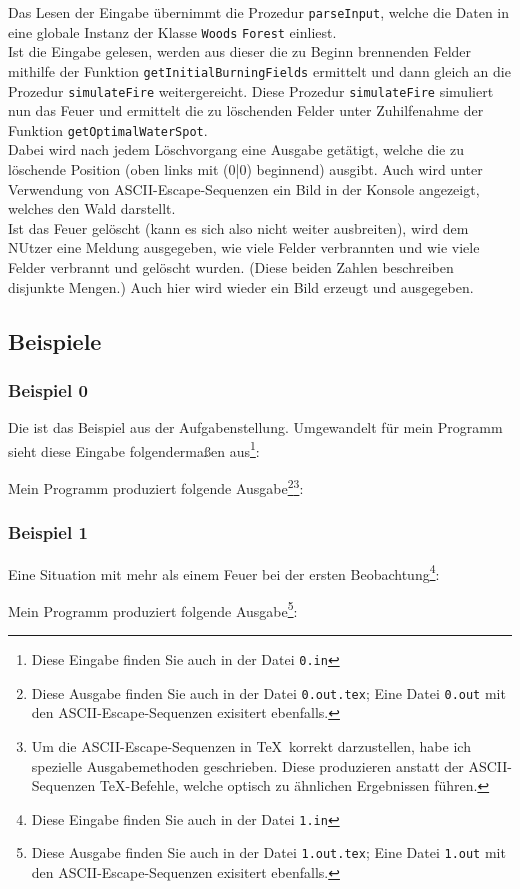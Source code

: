 Das Lesen der Eingabe übernimmt die Prozedur \texttt{parseInput}, welche die Daten in eine globale Instanz der Klasse \texttt{Woods} \texttt{Forest} einliest.\\
Ist die Eingabe gelesen, werden aus dieser die zu Beginn brennenden Felder mithilfe der Funktion \texttt{getInitialBurningFields} ermittelt und dann gleich an die Prozedur \texttt{simulateFire} weitergereicht. Diese Prozedur \texttt{simulateFire} simuliert nun das Feuer und ermittelt die zu löschenden Felder unter Zuhilfenahme der Funktion \texttt{getOptimalWaterSpot}.\\
Dabei wird nach jedem Löschvorgang eine Ausgabe getätigt, welche die zu löschende Position (oben links mit (0|0) beginnend) ausgibt. Auch wird unter Verwendung von ASCII-Escape-Sequenzen ein Bild in der Konsole angezeigt, welches den Wald darstellt.\\
Ist das Feuer gelöscht (kann es sich also nicht weiter ausbreiten), wird dem NUtzer eine Meldung ausgegeben, wie viele Felder verbrannten und wie viele Felder verbrannt und gelöscht wurden. (Diese beiden Zahlen beschreiben disjunkte Mengen.) Auch hier wird wieder ein Bild erzeugt und ausgegeben.
\newpage
\subsection{Beispiele}
\subsubsection{Beispiel 0}
Die ist das Beispiel aus der Aufgabenstellung. Umgewandelt für mein Programm sieht diese Eingabe folgendermaßen aus\footnote{Diese Eingabe finden Sie auch in der Datei \texttt{0.in}}:
{\small

}
Mein Programm produziert folgende Ausgabe\footnote{Diese Ausgabe finden Sie auch in der Datei \texttt{0.out.tex}; Eine Datei \texttt{0.out} mit den ASCII-Escape-Sequenzen exisitert ebenfalls.}\footnote{Um die ASCII-Escape-Sequenzen in \TeX\, korrekt darzustellen, habe ich spezielle Ausgabemethoden geschrieben. Diese produzieren anstatt der ASCII-Sequenzen \TeX -Befehle, welche optisch zu ähnlichen Ergebnissen führen.}:\\
{\ttfamily \small

}
\subsubsection{Beispiel 1}
Eine Situation mit mehr als einem Feuer bei der ersten Beobachtung\footnote{Diese Eingabe finden Sie auch in der Datei \texttt{1.in}}:
{\small

}
Mein Programm produziert folgende Ausgabe\footnote{Diese Ausgabe finden Sie auch in der Datei \texttt{1.out.tex}; Eine Datei \texttt{1.out} mit den ASCII-Escape-Sequenzen exisitert ebenfalls.}:\\
{\ttfamily \small

}
